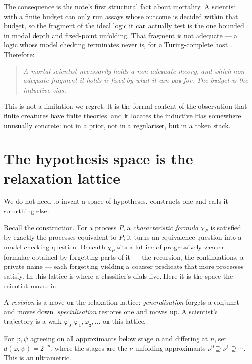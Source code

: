 The consequence is the note's first structural fact about mortality. A scientist with a finite budget
can only run assays whose outcome is decided within that budget, so the fragment of the ideal logic it
can actually test is the one bounded in modal depth and fixed-point unfolding. That fragment is not
adequate --- a logic whose model checking terminates never is, for a Turing-complete host
\cite[\S1.3]{ClassifierNote}. Therefore:

\begin{quote}
\itshape A mortal scientist necessarily holds a non-adequate theory, and which non-adequate fragment
it holds is fixed by what it can pay for. The budget is the inductive bias.
\end{quote}

This is not a limitation we regret. It is the formal content of the observation that finite creatures
have finite theories, and it locates the inductive bias somewhere unusually concrete: not in a prior,
not in a regulariser, but in a token stack.

\section{The hypothesis space is the relaxation lattice}\label{sci:S5}
\label{sci:sec:lattice}

We do not need to invent a space of hypotheses. \cite[\S3.3]{ClassifierNote} constructs one and calls
it something else.

Recall the construction. For a process $P$, a \emph{characteristic formula} $\chi_P$ is satisfied by
exactly the processes equivalent to $P$; it turns an equivalence question into a model-checking
question. Beneath $\chi_P$ sits a lattice of progressively weaker formulae obtained by forgetting
parts of it --- the recursion, the continuations, a private name --- each forgetting yielding a
coarser predicate that more processes satisfy. In \cite{ClassifierNote} this lattice is where a
classifier's dials live. Here it is the space the scientist moves in.

\begin{definition}[Revision]\label{sci:revision}
A \emph{revision} is a move on the relaxation lattice: \emph{generalisation} forgets a conjunct and
moves down, \emph{specialisation} restores one and moves up. A scientist's trajectory is a walk
$\varphi_0, \varphi_1, \varphi_2, \ldots$ on this lattice.
\end{definition}

\begin{definition}\label{sci:stratified-distance}
For $\varphi, \psi$ agreeing on all approximants below stage $n$ and differing at $n$, set
$d(\varphi, \psi) = 2^{-n}$, where the stages are the $\nu$-unfolding approximants
$\nu^0 \supseteq \nu^1 \supseteq \cdots$. This is an ultrametric.
\end{definition}

